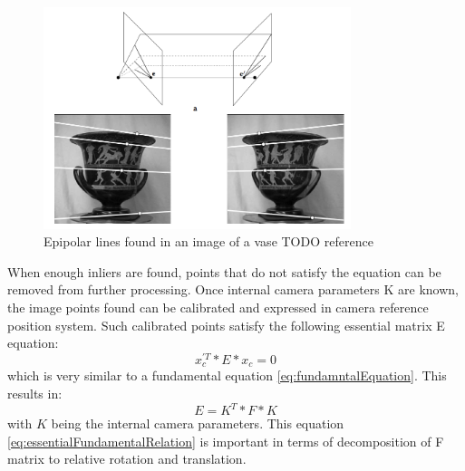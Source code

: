 \begin{figure}[p]
    \centering
    \includegraphics[width=0.8\textwidth]{EpipolarGeometry}
    \caption{Epipolar lines found in an image of a vase TODO reference}
    \label{fig:EpipolarGeometry}
\end{figure}
When enough inliers are found, points that do not satisfy the equation can be removed from further processing.
Once internal camera parameters K are known, the image points found can be calibrated and expressed in camera reference position system. Such calibrated points satisfy the following essential matrix E equation:
\begin{equation} \label{eq:essentialEquation}
{x}_{c}^{'T} * E * x_{c} = 0
\end{equation} 
which is very similar to a fundamental equation \ref{eq:fundamntalEquation}. This results in:
\begin{equation} \label{eq:essentialFundamentalRelation}
E = K^{T} * F * K
\end{equation} 
with $K$ being the internal camera parameters. This equation \ref{eq:essentialFundamentalRelation} is important in terms of decomposition of F matrix to relative rotation and translation.
